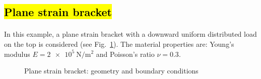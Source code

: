 \subsection{\hl{Plane strain bracket}}
\paragraph{}
In this example, a plane strain bracket with a downward uniform distributed load on the top is considered (see Fig.~\ref{adp_fig:ex_bracket_geo_bc}).
The material properties are: Young’s modulus $E = \SI{2e5}{\newton \per \square \meter}$ and Poisson’s ratio $\nu = 0.3$.
    \begin{figure}
        \centering
        \begin{subfigure}[b]{1\linewidth}
            \centering
        \end{subfigure}
    \end{figure}
    \begin{figure}\ContinuedFloat
        \begin{subfigure}[b]{1\linewidth}
            \centering
        \end{subfigure}
        \caption{ Plane strain bracket: geometry and boundary conditions}
        \label{adp_fig:ex_bracket_geo_bc}
    \end{figure}

